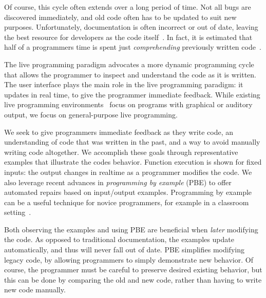 Of course, this cycle often extends over a long period of time.
Not all bugs are discovered immediately,
and old code often has to be updated to suit new purposes.
Unfortunately, documentation is often incorrect or out of date,
leaving the best resource for developers as the code itself~\cite{latoza2006maintaining}.
In fact, it is estimated that half of a programmers time
is spent just \textit{comprehending} previously written code~\cite{corbi1989program}.

The live programming paradigm advocates a more dynamic programming cycle that allows the programmer to inspect and understand the code as it is written. The user interface plays the main role in the live programming paradigm: it updates in real time, to give the programmer immediate feedback.  While existing live programming environments~\cite{victor2012, chugh2016programmatic, brown2009interacting} focus on programs with graphical or auditory output, we focus on general-purpose live programming.

We seek to give programmers immediate feedback as they write code,
an understanding of code that was written in the past, 
and a way to avoid manually writing code altogether.
We accomplish these goals through representative examples that illustrate the codes behavior.
Function execution is shown for fixed inputs: the output changes in realtime as a programmer modifies the code.
We also leverage recent advances in \textit{programming by example} (PBE) to offer automated repairs based on input/output examples.
Programming by example can be a useful technique for novice programmers, for example in a classroom setting~\cite{Suzuki2017}.

Both observing the examples and using PBE are beneficial when \textit{later} modifying the code.
As opposed to traditional documentation, the examples update automatically, and thus will never fall out of date.
PBE simplifies modifying legacy code, by allowing programmers to simply demonstrate new behavior.
Of course, the programmer must be careful to preserve desired existing behavior,
but this can be done by comparing the old and new code,
rather than having to write new code manually.


